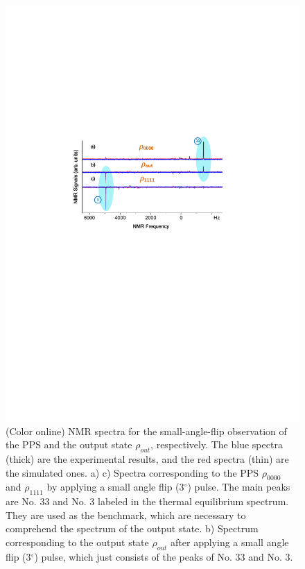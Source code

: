 \documentclass[twocolumn,showpacs,twoside,10pt,prl]{revtex4}
\begin{document}
\begin{figure}[htbp]
\begin{center}
\includegraphics[width=0.9\columnwidth]{lc4r}
\caption{\label{lc4r}(Color online) NMR spectra for the small-angle-flip observation of the
PPS and the output state $\rho _{out}$, respectively. The blue spectra (thick) are the experimental results, and the red spectra (thin) are the simulated ones. a) c) Spectra corresponding to the
PPS $\rho _{0000}$ and $\rho _{1111}$ by applying a
small angle flip (3$^{\circ}$) pulse. The main peaks are No. 33 and No. 3 labeled in the thermal equilibrium spectrum. They are used as the benchmark, which are necessary to comprehend the spectrum of the output state. b) Spectrum corresponding to the
output state $\rho _{out}$ after applying a small angle flip
(3$^{\circ}$) pulse, which just consists of the peaks of No. 33 and No. 3.}
\end{center}
\end{figure}
\end{document}
